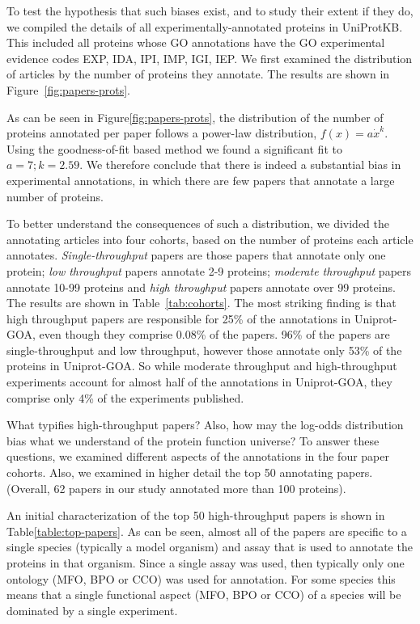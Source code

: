 \documentclass[12pt]{article}
\begin{document}
To test the hypothesis that such biases exist, and to study their extent if they
do, we compiled the details of all experimentally-annotated
proteins in UniProtKB. This included all proteins whose GO annotations have
the GO experimental evidence codes EXP, IDA, IPI, IMP, IGI, IEP. We first examined
the distribution of articles by the number of proteins they annotate. The results
are shown in Figure~\ref{fig:papers-prots}. 

As can be seen in Figure\ref{fig:papers-prots}, the distribution of the number of proteins
annotated per paper follows a power-law distribution, $f(x)=a\dot x^k$. 
Using the goodness-of-fit based
method we found a significant fit to $a=7; k=2.59$. 
We therefore conclude that there is indeed a substantial bias in
experimental annotations, in which there are few papers that annotate a large
number of proteins.

To better understand the consequences of such a distribution, we divided the annotating articles
into four cohorts, based on the number of proteins each article annotates.
\textit{Single-throughput} papers are those papers that annotate only one protein; \textit{low
throughput} papers annotate 2-9 proteins; \textit{moderate throughput} papers annotate 10-99
proteins and \textit{high throughput} papers annotate over 99 proteins. The results are shown in
Table~\ref{tab:cohorts}. The most striking finding is that high throughput papers are responsible
for 25\% of the annotations in Uniprot-GOA, even though they comprise 0.08\% of the papers. 96\%
of the papers are single-throughput and low throughput, however those annotate only 53\% of the
proteins in Uniprot-GOA. So while moderate throughput and high-throughput experiments account for
almost half of the annotations in Uniprot-GOA, they comprise only 4\% of the experiments
published.

What typifies high-throughput papers? Also, how may the log-odds distribution bias what we
understand of the protein function universe? To answer these questions, we examined
different aspects of the annotations in the four paper cohorts. Also, we examined in higher
detail the top 50 annotating papers. (Overall, 62 papers in our study annotated more than
100 proteins). 

An initial characterization of the top 50 high-throughput papers is shown in
Table\ref{table:top-papers}.  As can be seen, almost all of the papers are specific to a
single species (typically a model organism) and assay that is used to annotate the proteins
in that organism.  Since a single assay was used, then typically only one ontology (MFO, BPO
or CCO) was used for annotation. For some species this means that a single functional aspect
(MFO, BPO or CCO) of a species will be dominated by a single experiment.
\end{document}
